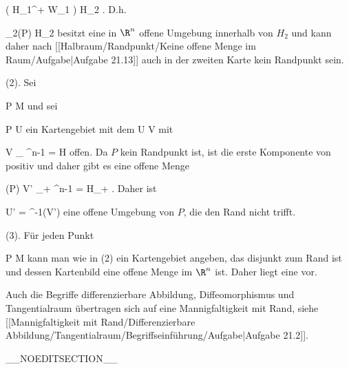 {{\mavergleichskette
{\vergleichskette
{ \tilde{\varphi} \left(  H_1^+ \cap W_1  \right)
}
{ \subseteq }{ H_2
}
{  }{
}
{    }{
}
{   }{
}
}
{}{}{.}
D.h.

\mavergleichskette
{\vergleichskette
{ \alpha_2(P)
}
{ \in }{ H_2
}
{  }{
}
{    }{
}
{   }{
}
}
{}{}{}
besitzt eine in $\R^n$ offene Umgebung innerhalb von $H_2$ und kann daher
nach [[Halbraum/Randpunkt/Keine offene Menge im Raum/Aufgabe|Aufgabe 21.13]]
auch in der zweiten Karte kein Randpunkt sein.}
{}
\teilbeweis {}{}{}
{(2). Sei

\mavergleichskette
{\vergleichskette
{ P
}
{ \notin }{ \partial M
}
{  }{
}
{    }{
}
{   }{
}
}
{}{}{}
und sei

\mavergleichskette
{\vergleichskette
{ P
}
{ \in }{ U
}
{  }{
}
{    }{
}
{   }{
}
}
{}{}{}
ein Kartengebiet mit dem
\maabbdisp {\alpha} { U } { V
} {}
mit

\mavergleichskette
{\vergleichskette
{ V
}
{ \subseteq }{ \R_{} \times \R^{n-1}
}
{ = }{ H
}
{    }{
}
{   }{
}
}
{}{}{}
offen. Da $P$ kein Randpunkt ist, ist die erste Komponente von
 positiv und daher gibt es eine offene Menge

\mavergleichskette
{\vergleichskette
{ \alpha(P)
}
{ \in }{ V'
}
{ \subseteq }{ \R_{+} \times \R^{n-1}
}
{ =   }{ H_+
}
{   }{
}
}
{}{}{.}
Daher ist

\mavergleichskette
{\vergleichskette
{ U'
}
{ = }{ \alpha^{-1}(V')
}
{  }{
}
{    }{
}
{   }{
}
}
{}{}{}
eine offene Umgebung von $P$, die
 {} {}
den Rand nicht trifft.}
{}
\teilbeweis {}{}{}
{(3). Für jeden Punkt

\mavergleichskette
{\vergleichskette
{ P
}
{ \notin }{ \partial M
}
{  }{
}
{    }{
}
{   }{
}
}
{}{}{}
kann man wie in (2) ein Kartengebiet angeben, das disjunkt zum Rand ist und dessen Kartenbild eine offene Menge im $\R^n$ ist. Daher liegt eine
 {} {}
vor.}
{}

}

Auch die Begriffe differenzierbare Abbildung, Diffeomorphismus und Tangentialraum übertragen sich auf eine Mannigfaltigkeit mit Rand, siehe
[[Mannigfaltigkeit mit Rand/Differenzierbare Abbildung/Tangentialraum/Begriffseinführung/Aufgabe|Aufgabe 21.2]].

__NOEDITSECTION__

